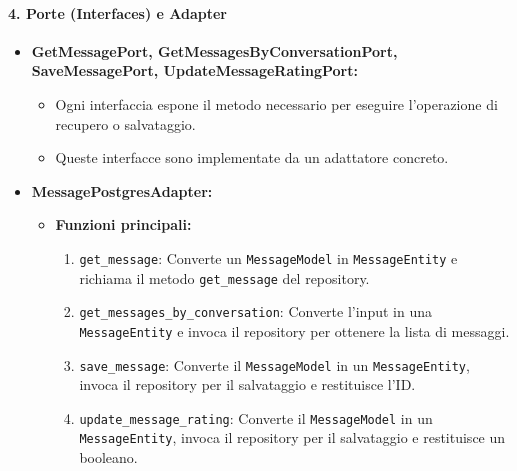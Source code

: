     \paragraph{4. Porte (Interfaces) e Adapter}
    \begin{itemize}
        \item \textbf{GetMessagePort, GetMessagesByConversationPort, SaveMessagePort, UpdateMessageRatingPort:}
        \begin{itemize}
            \item Ogni interfaccia espone il metodo necessario per eseguire l’operazione di recupero o salvataggio.
            \item Queste interfacce sono implementate da un adattatore concreto.
        \end{itemize}
        \item \textbf{MessagePostgresAdapter:}
        \begin{itemize}
            \item \textbf{Funzioni principali:}
            \begin{enumerate}
                \item \texttt{get\_message}: Converte un \texttt{MessageModel} in \texttt{MessageEntity} e richiama il metodo \texttt{get\_message} del repository.
                \item \texttt{get\_messages\_by\_conversation}: Converte l’input in una \texttt{MessageEntity} e invoca il repository per ottenere la lista di messaggi.
                \item \texttt{save\_message}: Converte il \texttt{MessageModel} in un \texttt{MessageEntity}, invoca il repository per il salvataggio e restituisce l’ID.
                \item \texttt{update\_message\_rating}: Converte il \texttt{MessageModel} in un \texttt{MessageEntity}, invoca il repository per il salvataggio e restituisce un booleano.
            \end{enumerate}
        \end{itemize}
    \end{itemize}


